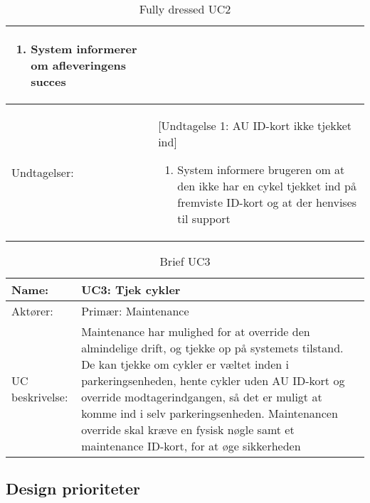\documentclass[../main.tex]{subfiles}
\begin{document}
\begin{table}[H]
\begin{tabularx}{\textwidth}{|l|X|}
\begin{enumerate}
        \item System informerer om afleveringens succes
    \end{enumerate} \\\hline\rowcolor[HTML]{DFDFDF}
    Undtagelser:                    & {[Undtagelse 1: AU ID-kort ikke tjekket ind]} 
    \setlist{nolistsep}
    \begin{enumerate}
        \item System informere brugeren om at den ikke har en cykel tjekket ind på fremviste ID-kort og at der henvises til support
    \end{enumerate}\\ \hline
\end{tabularx}
    \caption{Fully dressed UC2}
    \label{tab:UC2}
\end{table}


\begin{table}[H]
\begin{tabularx}{\textwidth}{|l|X|}\rowcolor[HTML]{DFDFDF}\hline
    Name:                           & UC3: Tjek cykler  \\ \hline
    Aktører:                        & Primær: Maintenance  \\\hline \rowcolor[HTML]{DFDFDF}
    UC beskrivelse:                 &   
    Maintenance har mulighed for at override den almindelige drift, og tjekke op på systemets tilstand. De kan tjekke om cykler er væltet inden i parkeringsenheden, hente cykler uden AU ID-kort og override modtagerindgangen, så det er muligt at komme ind i selv parkeringsenheden. Maintenancen override skal kræve en fysisk nøgle samt et maintenance ID-kort, for at øge sikkerheden
    \\\hline 
\end{tabularx}
    \caption{Brief UC3}
    \label{tab:UC3}
\end{table}

\subsection{Design prioriteter}
\end{document}
